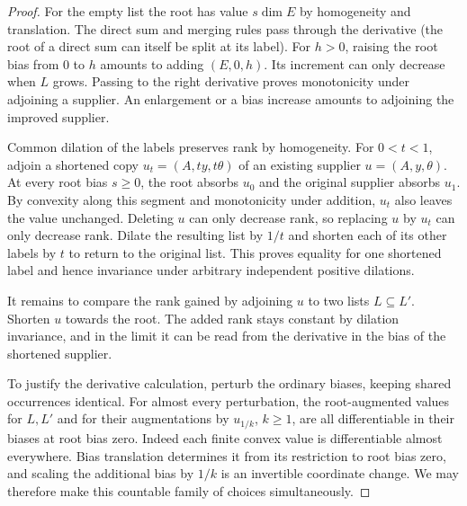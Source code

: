 \begin{proof}
For the empty list the root has value $s\dim E$ by homogeneity and
translation. The direct sum and merging rules pass through the derivative
(the root of a direct sum can itself be split at its label).
For $h>0$, raising the root bias from $0$ to $h$ amounts to adding
$(E,0,h)$. Its increment can only decrease when $L$ grows. Passing to
the right derivative proves monotonicity under adjoining a supplier.
An enlargement or a bias increase amounts to adjoining the improved
supplier.

Common dilation of the labels preserves rank by homogeneity. For
$0<t<1$, adjoin a shortened copy $u_t=(A,ty,t\theta)$ of an existing
supplier $u=(A,y,\theta)$. At every root bias $s\ge0$, the root
absorbs $u_0$ and the original supplier absorbs $u_1$. By convexity
along this segment and monotonicity under addition, $u_t$ also leaves
the value unchanged. Deleting $u$ can only decrease rank, so replacing
$u$ by $u_t$ can only decrease rank. Dilate the resulting list by
$1/t$ and shorten each of its other labels by $t$ to return to the
original list. This proves equality for one shortened label and hence
invariance under arbitrary independent positive dilations.

It remains to compare the rank gained by adjoining $u$ to two lists
$L\subseteq L'$. Shorten $u$ towards the root. The added rank stays
constant by dilation invariance, and in the limit it can be read from
the derivative in the bias of the shortened supplier.

To justify the derivative calculation, perturb the ordinary biases,
keeping shared occurrences identical. For almost every perturbation,
the root-augmented values for $L,L'$ and for their augmentations by
$u_{1/k}$, $k\ge1$, are all differentiable in their biases at root bias
zero. Indeed each finite convex value is differentiable almost
everywhere. Bias translation determines it from its restriction to
root bias zero, and scaling the additional bias by $1/k$ is an
invertible coordinate change. We may therefore make this countable
family of choices simultaneously.


\end{proof}

